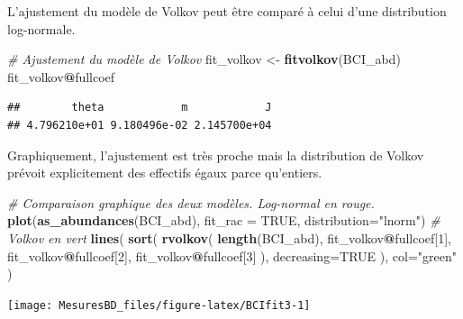 \documentclass[
  11pt,
  american,
  a4paper,
  extrafontsizes,onecolumn,openright
  ]{memoir}
\newenvironment{Shaded}{\begin{snugshade}}{\end{snugshade}}
\newcommand{\AttributeTok}[1]{\textcolor[rgb]{0.13,0.29,0.53}{#1}}
\newcommand{\CommentTok}[1]{\textcolor[rgb]{0.56,0.35,0.01}{\textit{#1}}}
\newcommand{\ConstantTok}[1]{\textcolor[rgb]{0.56,0.35,0.01}{#1}}
\newcommand{\DecValTok}[1]{\textcolor[rgb]{0.00,0.00,0.81}{#1}}
\newcommand{\FunctionTok}[1]{\textcolor[rgb]{0.13,0.29,0.53}{\textbf{#1}}}
\newcommand{\NormalTok}[1]{#1}
\newcommand{\OtherTok}[1]{\textcolor[rgb]{0.56,0.35,0.01}{#1}}
\newcommand{\SpecialCharTok}[1]{\textcolor[rgb]{0.81,0.36,0.00}{\textbf{#1}}}
\newcommand{\StringTok}[1]{\textcolor[rgb]{0.31,0.60,0.02}{#1}}
\begin{document}
\normalsize

L'ajustement du modèle de Volkov peut être comparé à celui d'une distribution log-normale.

\scriptsize

\begin{Shaded}
\begin{Highlighting}[]
\CommentTok{\# Ajustement du modèle de Volkov}
\NormalTok{fit\_volkov }\OtherTok{\textless{}{-}} \FunctionTok{fitvolkov}\NormalTok{(BCI\_abd)}
\NormalTok{fit\_volkov}\SpecialCharTok{@}\NormalTok{fullcoef}
\end{Highlighting}
\end{Shaded}

\begin{verbatim}
##        theta            m            J 
## 4.796210e+01 9.180496e-02 2.145700e+04
\end{verbatim}

\normalsize

Graphiquement, l'ajustement est très proche mais la distribution de Volkov prévoit explicitement des effectifs égaux parce qu'entiers.

\scriptsize

\begin{Shaded}
\begin{Highlighting}[]
\CommentTok{\# Comparaison graphique des deux modèles. Log{-}normal en rouge.}
\FunctionTok{plot}\NormalTok{(}\FunctionTok{as\_abundances}\NormalTok{(BCI\_abd), }\AttributeTok{fit\_rac =} \ConstantTok{TRUE}\NormalTok{, }\AttributeTok{distribution=}\StringTok{"lnorm"}\NormalTok{)}
\CommentTok{\# Volkov en vert}
\FunctionTok{lines}\NormalTok{(}
  \FunctionTok{sort}\NormalTok{(}
    \FunctionTok{rvolkov}\NormalTok{(}
      \FunctionTok{length}\NormalTok{(BCI\_abd), }
\NormalTok{      fit\_volkov}\SpecialCharTok{@}\NormalTok{fullcoef[}\DecValTok{1}\NormalTok{], }
\NormalTok{      fit\_volkov}\SpecialCharTok{@}\NormalTok{fullcoef[}\DecValTok{2}\NormalTok{], }
\NormalTok{      fit\_volkov}\SpecialCharTok{@}\NormalTok{fullcoef[}\DecValTok{3}\NormalTok{]}
\NormalTok{    ), }
    \AttributeTok{decreasing=}\ConstantTok{TRUE}
\NormalTok{  ), }
  \AttributeTok{col=}\StringTok{"green"}
\NormalTok{)}
\end{Highlighting}
\end{Shaded}

\begin{center}\texttt{[image: MesuresBD\_files/figure-latex/BCIfit3-1]} \end{center}
\end{document}
